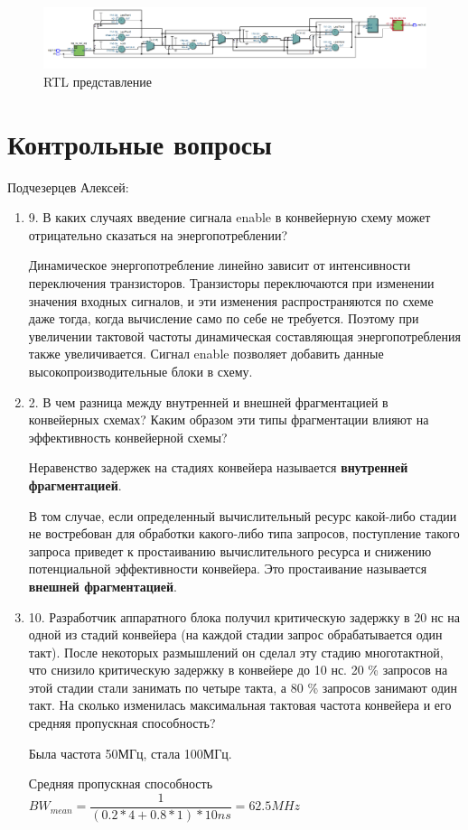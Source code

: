 \documentclass[a4paper,14pt]{article}
\begin{document}
	\begin{figure}[H]
		\centering
		\includegraphics[width=\linewidth]{images/dop_rtl}
		\caption{RTL представление}
		\label{fig:dop_rtl}
	\end{figure}

	\section{Контрольные вопросы}
	
	Подчезерцев Алексей:
	
	\begin{enumerate}
		\item 9. В каких случаях введение сигнала enable в конвейерную схему может отрицательно сказаться на энергопотреблении? 
		
		Динамическое энергопотребление линейно зависит от интенсивности переключения транзисторов.
		Транзисторы переключаются при изменении значения входных сигналов, и эти
		изменения распространяются по схеме даже тогда, когда вычисление само по себе не
		требуется. Поэтому при увеличении тактовой частоты динамическая составляющая
		энергопотребления также увеличивается. Сигнал enable позволяет добавить данные высокопроизводительные блоки в схему.
	
		\item 2. В чем разница между внутренней и внешней фрагментацией в конвейерных схемах?
		Каким образом эти типы фрагментации влияют на эффективность конвейерной	схемы?
		
		Неравенство задержек на стадиях конвейера называется \textbf{внутренней фрагментацией}.
		
		В том случае, если определенный вычислительный ресурс какой-либо стадии не востребован для
		обработки какого-либо типа запросов, поступление такого запроса приведет к простаиванию вычислительного
		ресурса и снижению потенциальной эффективности конвейера. Это простаивание
		называется \textbf{внешней фрагментацией}.
		
		\item 10. Разработчик аппаратного блока получил критическую задержку в 20 нс на одной из стадий конвейера (на каждой стадии запрос обрабатывается один такт). После некоторых размышлений он сделал эту стадию многотактной, что снизило критическую задержку в конвейере до 10 нс. 20 \% запросов на этой стадии стали занимать по четыре такта, а 80 \% запросов занимают один такт. На сколько	изменилась максимальная тактовая частота конвейера и его средняя пропускная способность?
		
		Была частота 50МГц, стала 100МГц.
		
		Средняя пропускная способность $BW_{mean} =  \dfrac{1}{(0.2 * 4 + 0.8 * 1) * 10ns} = 62.5MHz$

	\end{enumerate}
	
\end{document}
